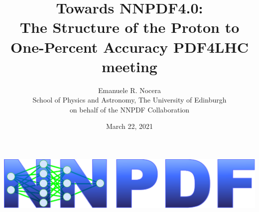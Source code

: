 \documentclass{beamer}
\title[Towards NNPDF4.0]{Towards NNPDF4.0:\\
The Structure of the Proton to One-Percent Accuracy
{\scriptsize PDF4LHC meeting}}
\date[March 22, 2021]{March 22, 2021}
\author[Emanuele R. Nocera]{Emanuele R. Nocera\\ {\scriptsize School of Physics and Astronomy, The University of Edinburgh\\ on behalf of the NNPDF Collaboration}}
\begin{document}
\beamertemplatenavigationsymbolsempty

\begin{frame}
\titlepage
\vspace{0.7cm}
\begin{flushright}
 \includegraphics[scale=0.15]{plots/nnpdf_logo_official}\\
\end{flushright}
\vspace{-0.7cm}
\end{frame}
\end{document}
